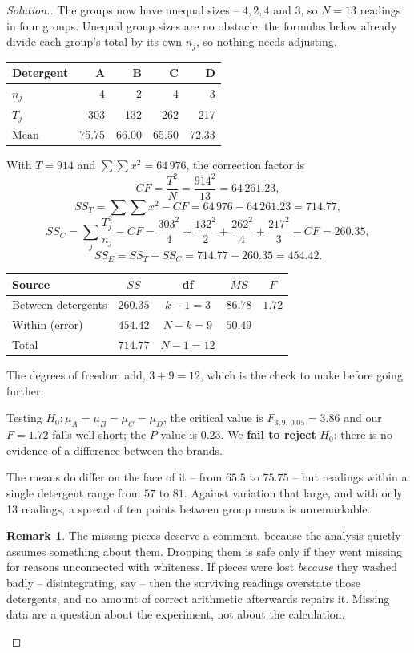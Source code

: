 \documentclass[11pt,a4paper]{article}
\theoremstyle{definition}
\newtheorem{remark}[thm]{Remark}
\newenvironment{solution}
  {\renewcommand{\qedsymbol}{}\begin{proof}[\textit{Solution}.]}
  {\end{proof}}
\begin{document}
\begin{solution}
The groups now have unequal sizes -- $4, 2, 4$ and $3$, so $N=13$ readings in four groups.
Unequal group sizes are no obstacle: the formulas below already divide each group's total by
its own $n_j$, so nothing needs adjusting.

\begin{table}[H]
\centering
\begin{tabular}{lrrrr}
Detergent & A & B & C & D\\
\hline
$n_j$   & 4   & 2   & 4   & 3\\
$T_j$   & 303 & 132 & 262 & 217\\
Mean    & 75.75 & 66.00 & 65.50 & 72.33\\
\end{tabular}
\end{table}

With $T=914$ and $\sum\sum x^2 = 64\,976$, the correction factor is
\[CF=\frac{T^2}{N}=\frac{914^2}{13}=64\,261.23,\]
\[SS_T=\sum\sum x^2-CF=64\,976-64\,261.23=714.77,\]
\[SS_C=\sum_j \frac{T_j^2}{n_j}-CF
=\frac{303^2}{4}+\frac{132^2}{2}+\frac{262^2}{4}+\frac{217^2}{3}-CF=260.35,\]
\[SS_E=SS_T-SS_C=714.77-260.35=454.42.\]

\begin{table}[H]
\centering
\begin{tabular}{lcccc}
Source & $SS$ & df & $MS$ & $F$\\
\hline
Between detergents & $260.35$ & $k-1=3$   & $86.78$ & $1.72$\\
Within (error)     & $454.42$ & $N-k=9$   & $50.49$ & \\
\hline
Total              & $714.77$ & $N-1=12$  & & \\
\end{tabular}
\end{table}
The degrees of freedom add, $3+9=12$, which is the check to make before going further.

Testing $H_0:\mu_A=\mu_B=\mu_C=\mu_D$, the critical value is $F_{3,9,\,0.05}=3.86$ and our
$F=1.72$ falls well short; the $P$-value is $0.23$. We \textbf{fail to reject} $H_0$: there
is no evidence of a difference between the brands.

The means do differ on the face of it -- from $65.5$ to $75.75$ -- but readings within a
single detergent range from $57$ to $81$. Against variation that large, and with only 13
readings, a spread of ten points between group means is unremarkable.

\begin{remark}
The missing pieces deserve a comment, because the analysis quietly assumes something about
them. Dropping them is safe only if they went missing for reasons unconnected with
whiteness. If pieces were lost \emph{because} they washed badly -- disintegrating, say --
then the surviving readings overstate those detergents, and no amount of correct arithmetic
afterwards repairs it. Missing data are a question about the experiment, not about the
calculation.
\end{remark}
\end{solution}
\end{document}
